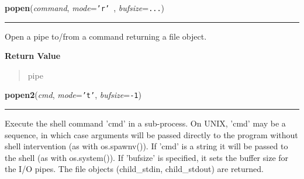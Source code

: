 \hspace{.8\funcindent}\begin{boxedminipage}{\funcwidth}

    \raggedright \textbf{popen}(\textit{command}, \textit{mode}={\tt 'r' }, \textit{bufsize}={\tt ...})

    \vspace{-1.5ex}

    \rule{\textwidth}{0.5\fboxrule}
\setlength{\parskip}{2ex}
    Open a pipe to/from a command returning a file object.

\setlength{\parskip}{1ex}
      \textbf{Return Value}
    \vspace{-1ex}

      \begin{quote}
      pipe

      \end{quote}

    \end{boxedminipage}

    \label{os:popen2}

    \vspace{0.5ex}

\hspace{.8\funcindent}\begin{boxedminipage}{\funcwidth}

    \raggedright \textbf{popen2}(\textit{cmd}, \textit{mode}={\tt \texttt{'}\texttt{t}\texttt{'}}, \textit{bufsize}={\tt -1})

    \vspace{-1.5ex}

    \rule{\textwidth}{0.5\fboxrule}
\setlength{\parskip}{2ex}
    Execute the shell command 'cmd' in a sub-process.  On UNIX, 'cmd' may 
    be a sequence, in which case arguments will be passed directly to the 
    program without shell intervention (as with os.spawnv()).  If 'cmd' is 
    a string it will be passed to the shell (as with os.system()). If 
    'bufsize' is specified, it sets the buffer size for the I/O pipes.  The
    file objects (child\_stdin, child\_stdout) are returned.

\setlength{\parskip}{1ex}
    \end{boxedminipage}

    \label{os:popen3}

    \vspace{0.5ex}

